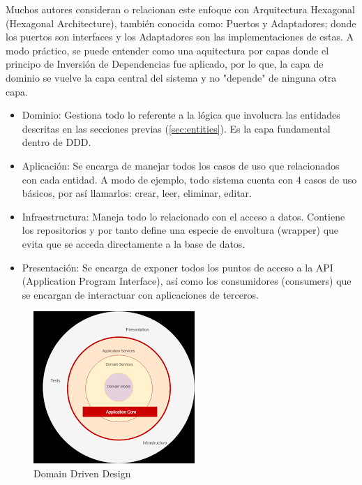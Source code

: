 Muchos autores consideran o relacionan este enfoque con Arquitectura Hexagonal (Hexagonal Architecture), también conocida como: Puertos y Adaptadores; donde los puertos son interfaces y los Adaptadores son las implementaciones de estas. A modo práctico, se puede entender como una aquitectura por capas donde el principo de Inversión de Dependencias fue aplicado, por lo que, la capa de dominio se vuelve la capa central del sistema y no "depende" de ninguna otra capa.

\begin{itemize}
	\item Dominio: Gestiona todo lo referente a la lógica que involucra las entidades descritas en las secciones previas (\ref{sec:entities}). Es la capa fundamental dentro de DDD.
	\item Aplicación: Se encarga de manejar todos los casos de uso que relacionados con cada entidad. A modo de ejemplo, todo sistema cuenta con 4 casos de uso básicos, por así llamarlos: crear, leer, eliminar, editar.
	\item Infraestructura: Maneja todo lo relacionado con el acceso a datos. Contiene los repositorios y por tanto define una especie de envoltura (wrapper) que evita que se acceda directamente a la base de datos.
	\item Presentación: Se encarga de exponer todos los puntos de acceso a la API (Application Program Interface), así como los consumidores (consumers) que se encargan de interactuar con aplicaciones de terceros.
\end{itemize}

\begin{figure}[h]
	\centering
	\includegraphics[width=0.5\linewidth]{images/Chapter 2/ddd}
	\caption{Domain Driven Design}
	\label{fig:ddd}
\end{figure}


